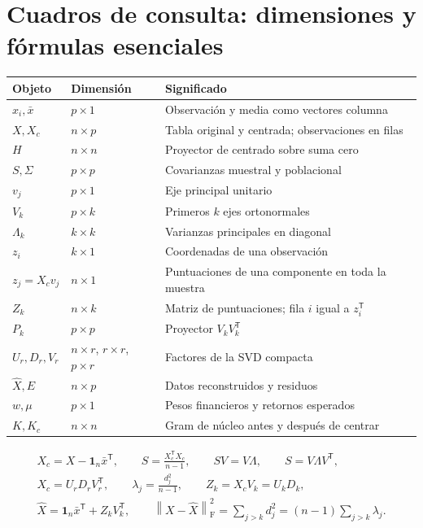\documentclass[11pt,a4paper]{article}
\newcommand{\T}{^{\mathsf T}}
\newcommand{\norm}[1]{\left\lVert #1\right\rVert}
\newcommand{\F}{_{\mathrm F}}
\newcommand{\ones}{\mathbf 1}
\theoremstyle{definition}
\begin{document}
\section{Cuadros de consulta: dimensiones y fórmulas esenciales}
\begin{center}\small
\begin{longtable}{p{2.7cm}p{2.4cm}p{9.8cm}}\toprule
Objeto & Dimensión & Significado\\\midrule\endhead
$x_i,\bar x$ & $p\times1$ & Observación y media como vectores columna\\
$X,X_c$ & $n\times p$ & Tabla original y centrada; observaciones en filas\\
$H$ & $n\times n$ & Proyector de centrado sobre suma cero\\
$S,\Sigma$ & $p\times p$ & Covarianzas muestral y poblacional\\
$v_j$ & $p\times1$ & Eje principal unitario\\
$V_k$ & $p\times k$ & Primeros $k$ ejes ortonormales\\
$\Lambda_k$ & $k\times k$ & Varianzas principales en diagonal\\
$z_i$ & $k\times1$ & Coordenadas de una observación\\
$z_j=X_cv_j$ & $n\times1$ & Puntuaciones de una componente en toda la muestra\\
$Z_k$ & $n\times k$ & Matriz de puntuaciones; fila $i$ igual a $z_i\T$\\
$P_k$ & $p\times p$ & Proyector $V_kV_k\T$\\
$U_r,D_r,V_r$ & $n\times r$, $r\times r$, $p\times r$ & Factores de la SVD compacta\\
$\widehat X,E$ & $n\times p$ & Datos reconstruidos y residuos\\
$w,\mu$ & $p\times1$ & Pesos financieros y retornos esperados\\
$K,K_c$ & $n\times n$ & Gram de núcleo antes y después de centrar\\\bottomrule
\end{longtable}\end{center}
\begin{idea}
\begin{gather*}
X_c=X-\ones_n\bar x\T,\qquad S=\frac{X_c\T X_c}{n-1},\qquad
SV=V\Lambda,\qquad S=V\Lambda V\T,\\
X_c=U_rD_rV_r\T,\qquad\lambda_j=\frac{d_j^2}{n-1},\qquad
Z_k=X_cV_k=U_kD_k,\\
\widehat X=\ones_n\bar x\T+Z_kV_k\T,\qquad
\norm{X-\widehat X}\F^2=\sum_{j>k}d_j^2=(n-1)\sum_{j>k}\lambda_j.
\end{gather*}
\end{idea}
\end{document}
